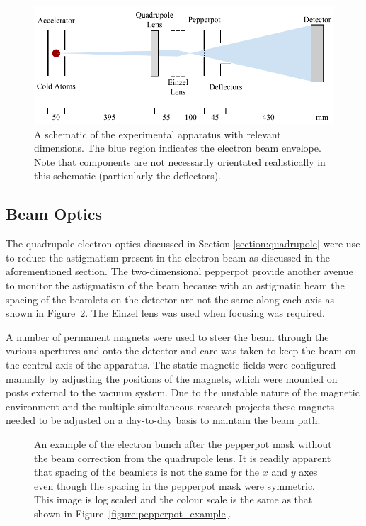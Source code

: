 \begin{figure}
\center
\includegraphics{part2/Figs/EmittanceApparatusSchematic.pdf}
\caption[Brightness measurement apparatus with dimensions.]{A schematic of the experimental apparatus with relevant dimensions. The blue region indicates the electron beam envelope. Note that components are not necessarily orientated realistically in this schematic (particularly the deflectors).}
\label{figure:emittance_schematic}
\end{figure}

\subsection{Beam Optics}
The quadrupole electron optics discussed in Section \ref{section:quadrupole} were use to reduce the astigmatism present in the electron beam as discussed in the aforementioned section.
The two-dimensional pepperpot provide another avenue to monitor the astigmatism of the beam because with an astigmatic beam the spacing of the beamlets on the detector are not the same along each axis as shown in Figure~\ref{figure:astigmatic_pepperpot}.
The Einzel lens was used when focusing was required.

A number of permanent magnets were used to steer the beam through the various apertures and onto the detector and care was taken to keep the beam on the central axis of the apparatus.
The static magnetic fields were configured manually by adjusting the positions of the magnets, which were mounted on posts external to the vacuum system.
Due to the unstable nature of the magnetic environment and the multiple simultaneous research projects these magnets needed to be adjusted on a day-to-day basis to maintain the beam path.

\begin{figure}
    \center
    
    \caption[Pepperpot measurements with and without beam astigmatism correction.]{An example of the electron bunch after the pepperpot mask without the beam correction from the quadrupole lens. It is readily apparent that spacing of the beamlets is not the same for the $x$ and $y$ axes even though the spacing in the pepperpot mask were symmetric. This image is log scaled and the colour scale is the same as that shown in Figure~\ref{figure:pepperpot_example}.}
    \label{figure:astigmatic_pepperpot}
\end{figure}

